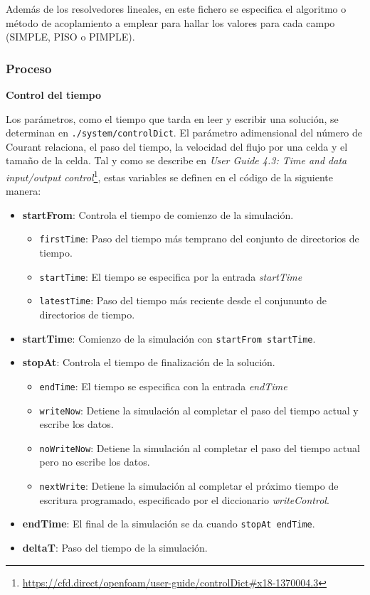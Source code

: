 Además de los resolvedores lineales, en este fichero se especifica el
algoritmo o método de acoplamiento a emplear para hallar los valores
para cada campo (SIMPLE, PISO o PIMPLE).

\subsubsection{Proceso}\label{header-n250}

\textbf{Control del tiempo}

Los parámetros, como el tiempo que tarda en leer y escribir una
solución, se determinan en
\lstinline[style=bash]{./system/controlDict}. El parámetro adimensional
del número de Courant relaciona, el paso del tiempo, la velocidad del
flujo por una celda y el tamaño de la celda. Tal y como se describe en \emph{User
Guide 4.3: Time and data input/output control}\footnote{\url{https://cfd.direct/openfoam/user-guide/controlDict\#x18-1370004.3}}, estas variables se
definen en el código de la siguiente manera:

\begin{itemize}
\item
  \textbf{startFrom}: Controla el tiempo de comienzo de la simulación.

  \begin{itemize}
  \item
    \texttt{firstTime}: Paso del tiempo más temprano del conjunto de
    directorios de tiempo.
  \item
    \texttt{startTime}: El tiempo se especifica por la entrada
    \emph{startTime}
  \item
    \texttt{latestTime}: Paso del tiempo más reciente desde el
    conjununto de directorios de tiempo.
  \end{itemize}
\item
  \textbf{startTime}: Comienzo de la simulación con
  \texttt{startFrom\ startTime}.
\item
  \textbf{stopAt}: Controla el tiempo de finalización de la solución.

  \begin{itemize}
  \item
    \texttt{endTime}: El tiempo se especifica con la entrada
    \emph{endTime}
  \item
    \texttt{writeNow}: Detiene la simulación al completar el paso del
    tiempo actual y escribe los datos.
  \item
    \texttt{noWriteNow}: Detiene la simulación al completar el paso del
    tiempo actual pero no escribe los datos.
  \item
    \texttt{nextWrite}: Detiene la simulación al completar el próximo
    tiempo de escritura programado, especificado por el diccionario
    \emph{writeControl}.
  \end{itemize}
\item
  \textbf{endTime}: El final de la simulación se da cuando
  \texttt{stopAt\ endTime}.
\item
  \textbf{deltaT}: Paso del tiempo de la simulación.
\end{itemize}

